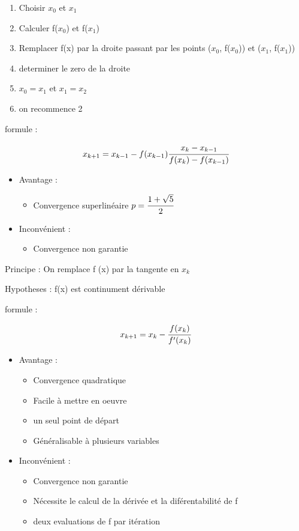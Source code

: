 \begin{enumerate}
    \item Choisir $x_0$ et $x_1$
    \item Calculer f($x_0$) et f($x_1$)
    \item Remplacer f(x) par la droite passant par les points ($x_0$, f($x_0$)) et ($x_1$, f($x_1$))
    \item determiner le zero de la droite
    \item $x_0 = x_1$ et $x_1 = x_2$
    \item on recommence 2
\end{enumerate}

formule :

$$x_{k+1} = x_{k-1} - f(x_{k-1}) \cfrac{x_{k} - x_{k-1}}{f(x_{k}) - f(x_{k-1})}$$


\begin{itemize}
    \item Avantage : 
    \begin{itemize}
        \item Convergence superlinéaire $p = \cfrac{1 + \sqrt{5}}{2}$
    \end{itemize}
    \item Inconvénient : 
    \begin{itemize}
        \item Convergence non garantie
    \end{itemize}
\end{itemize}

\newpage
{}

Principe :
On remplace f (x) par la tangente en $x_k$

Hypotheses : 
f(x) est continument dérivable

formule : 

$$x_{k+1} = x_k - \cfrac{f(x_k)}{f'(x_k)}$$


\begin{itemize}
    \item Avantage : 
    \begin{itemize}
        \item Convergence quadratique
        \item Facile à mettre en oeuvre
        \item un seul point de départ
        \item Généralisable à plusieurs variables
    \end{itemize}
    \item Inconvénient : 
    \begin{itemize}
        \item Convergence non garantie
        \item Nécessite le calcul de la dérivée et la diférentabilité de f
        \item deux evaluations de f par itération
    \end{itemize}

\end{itemize}	

